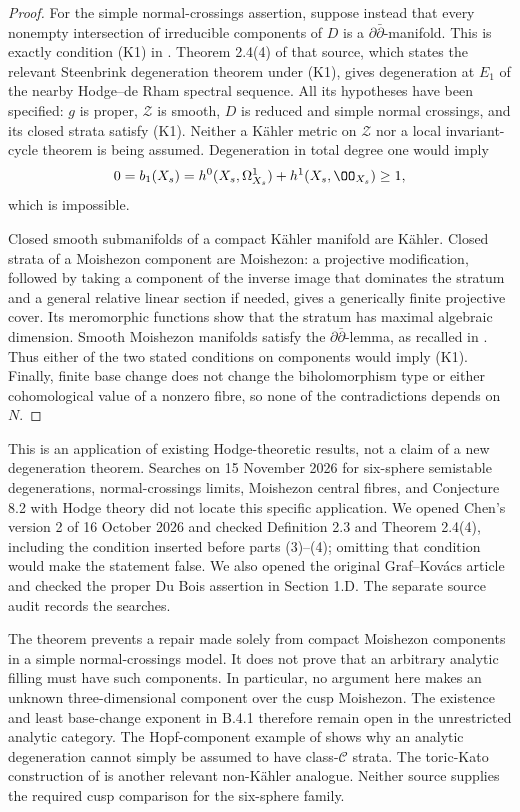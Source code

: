 \begin{proof}
For the simple normal-crossings assertion, suppose instead that
every nonempty intersection of irreducible components of $D$
is a $\partial\bar\partial$-manifold. This is exactly condition
(K1) in \citet[Definition 2.3]{Chen2026HodgeRoot}.
Theorem 2.4(4) of that source, which states the relevant
Steenbrink degeneration theorem under (K1), gives degeneration
at $E_1$ of the nearby Hodge--de Rham spectral sequence.
All its hypotheses have been specified: $g$ is proper,
$\mathcal Z$ is smooth, $D$ is reduced and simple normal
crossings, and its closed strata satisfy (K1). Neither a
K\"ahler metric on $\mathcal Z$ nor a local invariant-cycle
theorem is being assumed. Degeneration in total degree one
would imply
\[
 0=b_1(X_s)=h^0(X_s,\Omega^1_{X_s})+h^1(X_s,\OO_{X_s})
          \geq1,
\]
which is impossible.

Closed smooth submanifolds of a compact K\"ahler manifold are
K\"ahler. Closed strata of a Moishezon component are Moishezon:
a projective modification, followed by taking a component of
the inverse image that dominates the stratum and a general
relative linear section if needed, gives a generically finite
projective cover. Its meromorphic functions show that the
stratum has maximal algebraic dimension. Smooth Moishezon
manifolds satisfy the $\partial\bar\partial$-lemma, as recalled
in \citet[Section 2.1, p.8]{Chen2026HodgeRoot}. Thus either
of the two stated conditions on components would imply (K1).
Finally, finite base change does not change the biholomorphism
type or either cohomological value of a nonzero fibre, so none
of the contradictions depends on $N$.
\end{proof}

This is an application of existing Hodge-theoretic results, not
a claim of a new degeneration theorem. Searches on 15 November
2026 for six-sphere semistable degenerations, normal-crossings
limits, Moishezon central fibres, and Conjecture 8.2 with Hodge
theory did not locate this specific application. We opened
Chen's version 2 of 16 October 2026 and checked Definition 2.3
and Theorem 2.4(4), including the condition inserted before
parts (3)--(4); omitting that condition would make the
statement false. We also opened the original Graf--Kov\'acs
article and checked the proper Du Bois assertion in Section
1.D. The separate source audit records the searches.

The theorem prevents a repair made solely from compact
Moishezon components in a simple normal-crossings model.
It does not prove that an arbitrary analytic filling must have
such components. In particular, no argument here makes an
unknown three-dimensional component over the cusp Moishezon.
The existence and least base-change exponent in B.4.1 therefore
remain open in the unrestricted analytic category.
The Hopf-component example of
\citet[Theorem 1.4 and Example 2.1]{Nishiguchi1988IIRoot}
shows why an analytic degeneration cannot simply be assumed to
have class-$\mathcal C$ strata. The toric-Kato construction of
\citet[Theorem 7.1]{IstratiEtAl2022Root} is another relevant
non-K\"ahler analogue. Neither source supplies the required
cusp comparison for the six-sphere family.



